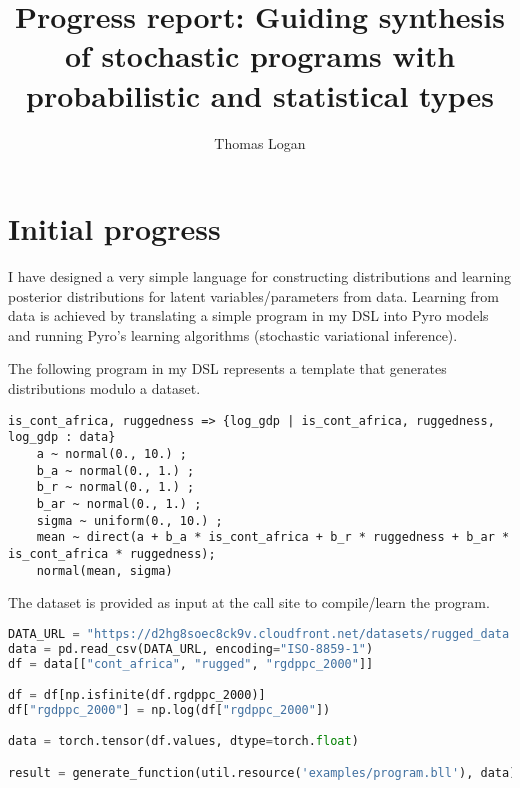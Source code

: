 \documentclass[runningheads]{llncs}
\title{Progress report: Guiding synthesis of stochastic programs with probabilistic and statistical types}
\author{Thomas Logan}
\institute{University of Texas at Austin}
\begin{document}
\maketitle

\section{Initial progress}
I have designed a very simple language for constructing distributions and learning posterior distributions for 
latent variables/parameters from data. Learning from data is achieved by translating a simple program in my DSL into Pyro models and running Pyro's learning algorithms (stochastic variational inference).
\newline

\noindent
The following program in my DSL represents a template that generates distributions modulo a dataset.
\begin{lstlisting}
is_cont_africa, ruggedness => {log_gdp | is_cont_africa, ruggedness, log_gdp : data}
    a ~ normal(0., 10.) ; 
    b_a ~ normal(0., 1.) ; 
    b_r ~ normal(0., 1.) ; 
    b_ar ~ normal(0., 1.) ;
    sigma ~ uniform(0., 10.) ;
    mean ~ direct(a + b_a * is_cont_africa + b_r * ruggedness + b_ar * is_cont_africa * ruggedness);
    normal(mean, sigma)
\end{lstlisting}

\noindent
The dataset is provided as input at the call site to compile/learn the program.
\begin{lstlisting}[language=Python]
DATA_URL = "https://d2hg8soec8ck9v.cloudfront.net/datasets/rugged_data.csv"
data = pd.read_csv(DATA_URL, encoding="ISO-8859-1")
df = data[["cont_africa", "rugged", "rgdppc_2000"]]

df = df[np.isfinite(df.rgdppc_2000)]
df["rgdppc_2000"] = np.log(df["rgdppc_2000"])

data = torch.tensor(df.values, dtype=torch.float)

result = generate_function(util.resource('examples/program.bll'), data)
\end{lstlisting}
\end{document}
